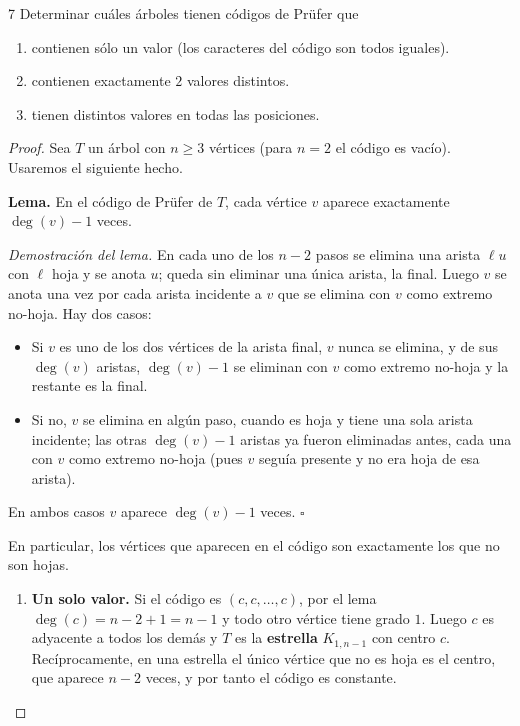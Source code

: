 \vspace{0.5cm}

\begin{ejercicio}{7}
    Determinar cuáles árboles tienen códigos de Prüfer que
    \begin{enumerate}
        \item contienen sólo un valor (los caracteres del código son todos iguales).
        \item contienen exactamente \( 2 \) valores distintos.
        \item tienen distintos valores en todas las posiciones.
    \end{enumerate}
\end{ejercicio}
\begin{proof}
    Sea \( T \) un árbol con \( n \geq 3 \) vértices (para \( n = 2 \) el código es vacío). Usaremos el siguiente hecho.

    \textbf{Lema.} En el código de Prüfer de \( T \), cada vértice \( v \) aparece exactamente \( \deg(v) - 1 \) veces.

    \emph{Demostración del lema.} En cada uno de los \( n-2 \) pasos se elimina una arista \( \ell u \) con \( \ell \) hoja y se anota \( u \); queda sin eliminar una única arista, la final. Luego \( v \) se anota una vez por cada arista incidente a \( v \) que se elimina con \( v \) como extremo no-hoja. Hay dos casos:
    \begin{itemize}
        \item Si \( v \) es uno de los dos vértices de la arista final, \( v \) nunca se elimina, y de sus \( \deg(v) \) aristas, \( \deg(v) - 1 \) se eliminan con \( v \) como extremo no-hoja y la restante es la final.
        \item Si no, \( v \) se elimina en algún paso, cuando es hoja y tiene una sola arista incidente; las otras \( \deg(v) - 1 \) aristas ya fueron eliminadas antes, cada una con \( v \) como extremo no-hoja (pues \( v \) seguía presente y no era hoja de esa arista).
    \end{itemize}
    En ambos casos \( v \) aparece \( \deg(v) - 1 \) veces. \( \square \)

    En particular, los vértices que aparecen en el código son exactamente los que no son hojas.

    \begin{enumerate}
        \item \textbf{Un solo valor.} Si el código es \( (c, c, \ldots, c) \), por el lema \( \deg(c) = n - 2 + 1 = n - 1 \) y todo otro vértice tiene grado \( 1 \). Luego \( c \) es adyacente a todos los demás y \( T \) es la \textbf{estrella} \( K_{1,n-1} \) con centro \( c \). Recíprocamente, en una estrella el único vértice que no es hoja es el centro, que aparece \( n-2 \) veces, y por tanto el código es constante.


\end{enumerate}
\end{proof}
